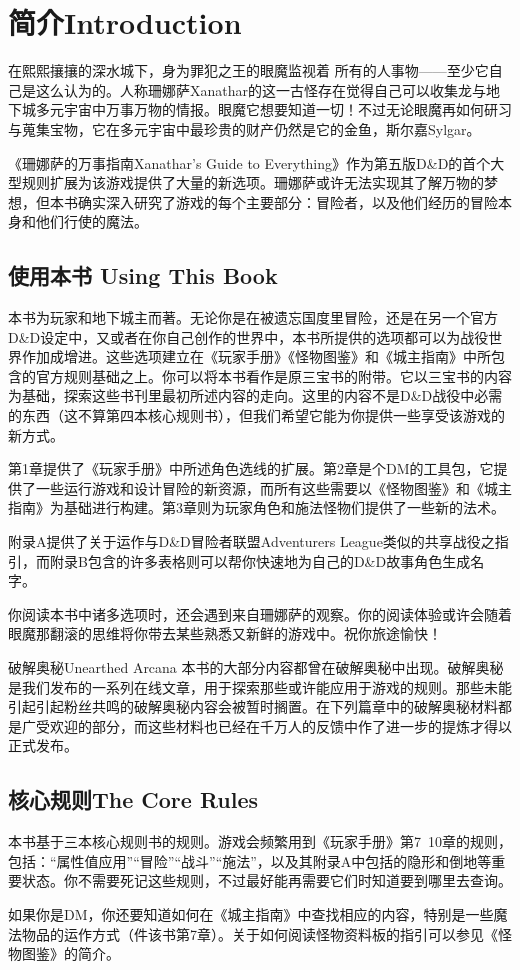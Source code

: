 \documentclass[letterpaper,10pt,twoside,twocolumn,openany]{dndbook}
\begin{document}
\chapter{简介Introduction}
\par{在熙熙攘攘的深水城下，身为罪犯之王的眼魔监视着  所有的人事物——至少它自己是这么认为的。人称珊娜萨Xanathar的这一古怪存在觉得自己可以收集龙与地下城多元宇宙中万事万物的情报。眼魔它想要知道一切！不过无论眼魔再如何研习与蒐集宝物，它在多元宇宙中最珍贵的财产仍然是它的金鱼，斯尔嘉Sylgar。}
\par{《珊娜萨的万事指南Xanathar’s Guide to Everything》作为第五版D\&D的首个大型规则扩展为该游戏提供了大量的新选项。珊娜萨或许无法实现其了解万物的梦想，但本书确实深入研究了游戏的每个主要部分：冒险者，以及他们经历的冒险本身和他们行使的魔法。}
\section{使用本书 Using This Book }
\par{本书为玩家和地下城主而著。无论你是在被遗忘国度里冒险，还是在另一个官方D\&D设定中，又或者在你自己创作的世界中，本书所提供的选项都可以为战役世界作加成增进。这些选项建立在《玩家手册》《怪物图鉴》和《城主指南》中所包含的官方规则基础之上。你可以将本书看作是原三宝书的附带。它以三宝书的内容为基础，探索这些书刊里最初所述内容的走向。这里的内容不是D\&D战役中必需的东西（这不算第四本核心规则书），但我们希望它能为你提供一些享受该游戏的新方式。}
\par{第1章提供了《玩家手册》中所述角色选线的扩展。第2章是个DM的工具包，它提供了一些运行游戏和设计冒险的新资源，而所有这些需要以《怪物图鉴》和《城主指南》为基础进行构建。第3章则为玩家角色和施法怪物们提供了一些新的法术。}
\par{附录A提供了关于运作与D\&D冒险者联盟Adventurers League类似的共享战役之指引，而附录B包含的许多表格则可以帮你快速地为自己的D\&D故事角色生成名字。}
\par{你阅读本书中诸多选项时，还会遇到来自珊娜萨的观察。你的阅读体验或许会随着眼魔那翻滚的思维将你带去某些熟悉又新鲜的游戏中。祝你旅途愉快！}
\begin{paperbox}{破解奥秘Unearthed Arcana}
本书的大部分内容都曾在破解奥秘中出现。破解奥秘是我们发布的一系列在线文章，用于探索那些或许能应用于游戏的规则。那些未能引起引起粉丝共鸣的破解奥秘内容会被暂时搁置。在下列篇章中的破解奥秘材料都是广受欢迎的部分，而这些材料也已经在千万人的反馈中作了进一步的提炼才得以正式发布。
\end{paperbox}
\clearpage
\section{核心规则The Core Rules }
\par{本书基于三本核心规则书的规则。游戏会频繁用到《玩家手册》第7~10章的规则，包括：“属性值应用”“冒险”“战斗”“施法”，以及其附录A中包括的隐形和倒地等重要状态。你不需要死记这些规则，不过最好能再需要它们时知道要到哪里去查询。}
\par{如果你是DM，你还要知道如何在《城主指南》中查找相应的内容，特别是一些魔法物品的运作方式（件该书第7章）。关于如何阅读怪物资料板的指引可以参见《怪物图鉴》的简介。}
\end{document}
